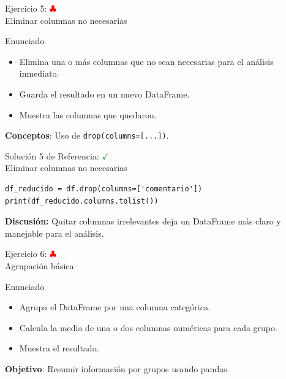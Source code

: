 \documentclass[10pt]{beamer}
\begin{document}
\begin{frame}{Ejercicio 5: \hfill \textcolor{red}{$\clubsuit$} \\ Eliminar columnas no necesarias}
  \begin{block}{Enunciado}
    \begin{itemize}
      \item Elimina una o más columnas que no sean necesarias para el análisis inmediato.
      \item Guarda el resultado en un nuevo DataFrame.
      \item Muestra las columnas que quedaron.
    \end{itemize}
  \end{block}
  \textbf{Conceptos}: Uso de \texttt{drop(columns=[...])}.
\end{frame}

\begin{solutionblock}
\begin{frame}[fragile]{Solución 5 de Referencia: \hfill \textcolor{green}{$\checkmark$} \\ Eliminar columnas no necesarias}
\begin{verbatim}
df_reducido = df.drop(columns=['comentario'])
print(df_reducido.columns.tolist())
\end{verbatim}
\textbf{Discusión:} Quitar columnas irrelevantes deja un DataFrame más claro y manejable para el análisis.
\end{frame}
\end{solutionblock}

\begin{frame}{Ejercicio 6: \hfill \textcolor{red}{$\clubsuit$} \\ Agrupación básica}
  \begin{block}{Enunciado}
    \begin{itemize}
      \item Agrupa el DataFrame por una columna categórica.
      \item Calcula la media de una o dos columnas numéricas para cada grupo.
      \item Muestra el resultado.
    \end{itemize}
  \end{block}
  \textbf{Objetivo}: Resumir información por grupos usando pandas.
\end{frame}
\end{document}
